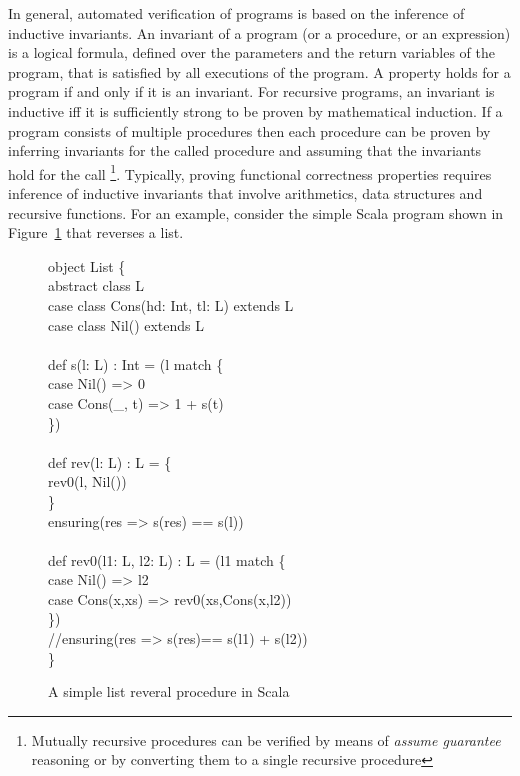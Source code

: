 In general, automated verification of programs is based on the inference of inductive invariants.
An invariant of a program (or a procedure, or an expression) is a logical formula, defined over the 
parameters and the return variables of the program, that is satisfied by all executions of the program. 
A property holds for a program if and only if it is an invariant. 
For recursive programs, an invariant is inductive iff it is sufficiently strong to be 
proven by mathematical induction. 
If a program consists of multiple procedures then each procedure can be proven by inferring invariants
for the called procedure and assuming that the invariants hold for the call 
\footnote{Mutually recursive procedures can be 
verified by means of \emph{assume guarantee} reasoning or by converting them 
to a single recursive procedure}.
Typically, proving functional correctness properties requires inference of inductive invariants
that involve arithmetics, data structures and recursive functions. 
For an example, consider the simple Scala program shown in Figure~\ref{fig:eg} that reverses a list. 
%
\begin{figure}
\begin{myprogram}
object List \{ \\
\pnl \>    abstract class L \\
\pnl \>    case class Cons(hd: Int, tl: L) extends L \\
\pnl \>    case class Nil() extends L \\
\\
\pnl \>    def s(l: L) : Int = (l match \{ \\
\pnl \> \>      case Nil() => 0 \\
\pnl \> \>      case Cons(\_, t) => 1 + s(t) \\
\pnl \>    \}) \\
\\
\pnl \>    def rev(l: L) : L = \{ \\
\pnl \> \>      rev0(l, Nil())  \\
\pnl \>    \} \\
\pnl \>    ensuring(res => s(res) == s(l))\\
\\    
\pnl \>    def rev0(l1: L, l2: L) : L = (l1 match \{ \\
\pnl \> \>    case Nil() => l2 \\
\pnl \> \>    case Cons(x,xs) => rev0(xs,Cons(x,l2)) \\
\pnl \>    \}) \\ 
\pnl \>    //ensuring(res => s(res)== s(l1) + s(l2)) \\
\}
\end{myprogram}
\caption{A simple list reveral procedure in Scala} \label{fig:eg}
\end{figure}
